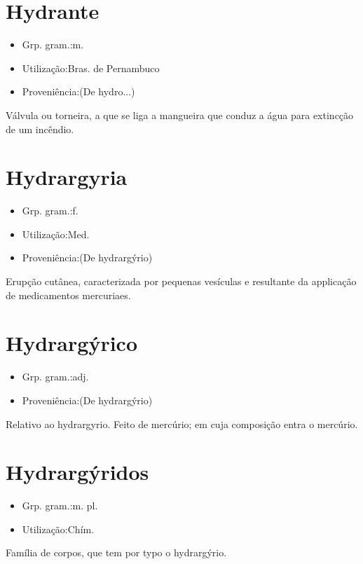 \documentclass{article}
\begin{document}
\section{Hydrante}
\begin{itemize}
\item {Grp. gram.:m.}
\end{itemize}
\begin{itemize}
\item {Utilização:Bras. de Pernambuco}
\end{itemize}
\begin{itemize}
\item {Proveniência:(De \textunderscore hydro...\textunderscore )}
\end{itemize}
Válvula ou torneira, a que se liga a mangueira que conduz a água para extincção de um incêndio.
\section{Hydrargyria}
\begin{itemize}
\item {Grp. gram.:f.}
\end{itemize}
\begin{itemize}
\item {Utilização:Med.}
\end{itemize}
\begin{itemize}
\item {Proveniência:(De \textunderscore hydrargýrio\textunderscore )}
\end{itemize}
Erupção cutânea, caracterizada por pequenas vesículas e resultante da applicação de medicamentos mercuriaes.
\section{Hydrargýrico}
\begin{itemize}
\item {Grp. gram.:adj.}
\end{itemize}
\begin{itemize}
\item {Proveniência:(De \textunderscore hydrargýrio\textunderscore )}
\end{itemize}
Relativo ao hydrargyrio.
Feito de mercúrio; em cuja composição entra o mercúrio.
\section{Hydrargýridos}
\begin{itemize}
\item {Grp. gram.:m. pl.}
\end{itemize}
\begin{itemize}
\item {Utilização:Chím.}
\end{itemize}
Família de corpos, que tem por typo o hydrargýrio.
\end{document}
